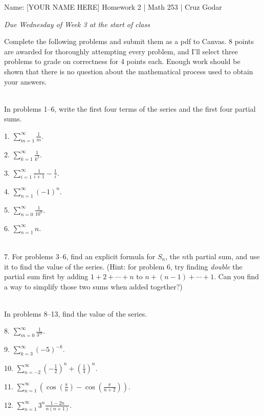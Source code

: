 \documentclass{article}
\begin{document}
\Large Name: [YOUR NAME HERE] \hfill Homework 2 | Math 253 | Cruz Godar \vspace{4pt} \normalsize

\textit{Due Wednesday of Week 3 at the start of class}

Complete the following problems and submit them as a pdf to Canvas. 8 points are awarded for thoroughly attempting every problem, and I'll select three problems to grade on correctness for 4 points each. Enough work should be shown that there is no question about the mathematical process used to obtain your answers.

~\\

In problems 1--6, write the first four terms of the series and the first four partial sums.

1. $\displaystyle \sum_{m = 1}^\infty \frac{1}{m}$.

2. $\displaystyle \sum_{k = 1}^\infty \frac{1}{k^2}$.

3. $\displaystyle \sum_{i = 1}^\infty \frac{1}{i + 1} - \frac{1}{i}$.

4. $\displaystyle \sum_{n = 1}^\infty (-1)^n$.

5. $\displaystyle \sum_{n = 0}^\infty \frac{1}{10^n}$.

6. $\displaystyle \sum_{n = 1}^\infty n$.

~\\

7. For problems 3--6, find an explicit formula for $S_n$, the $n$th partial sum, and use it to find the value of the series. (Hint: for problem 6, try finding \textit{double} the partial sum first by adding $1 + 2 + \cdots + n$ to $n + (n - 1) + \cdots + 1$. Can you find a way to simplify those two sums when added together?)

~\\

In problems 8--13, find the value of the series.

8. $\displaystyle \sum_{m = 0}^\infty \frac{1}{3^m}$.

9. $\displaystyle \sum_{k = 3}^\infty (-5)^{-k}$.

10. $\displaystyle \sum_{n = -2}^\infty \left( -\frac{1}{2} \right)^n + \left( \frac{1}{4} \right)^n$.

11. $\displaystyle \sum_{n = 1}^\infty \left( \cos\left( \frac{\pi}{n} \right) - \cos\left( \frac{\pi}{n + 2} \right) \right)$.

12. $\displaystyle \sum_{n = 1}^\infty 3^n\frac{1 - 2n}{n(n + 1)}$.
\end{document}
